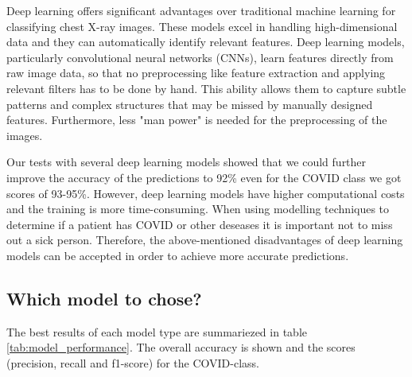 \documentclass{article}
\begin{document}
Deep learning offers significant advantages over traditional machine learning for classifying chest X-ray images. These models excel in handling high-dimensional data and they can automatically identify relevant features. Deep learning models, particularly convolutional neural networks (CNNs), learn features directly from raw image data, so that no preprocessing like feature extraction and applying relevant filters has to be done by hand. This ability allows them to capture subtle patterns and complex structures that may be missed by manually designed features. Furthermore, less "man power" is needed for the preprocessing of the images. 

Our tests with several deep learning models showed that we could further improve the accuracy of the predictions to 92\% even for the COVID class we got scores of 93-95\%. However, deep learning models have higher computational costs and the training is more time-consuming. When using modelling techniques to determine if a patient has COVID or other deseases it is important not to miss out a sick person. Therefore, the above-mentioned disadvantages of deep learning models can be accepted in order to achieve more accurate predictions.


\subsection{Which model to chose?}
The best results of each model type are summariezed in table \ref{tab:model_performance}. The overall accuracy is shown and the scores (precision, recall and f1-score) for the COVID-class. 
\end{document}

